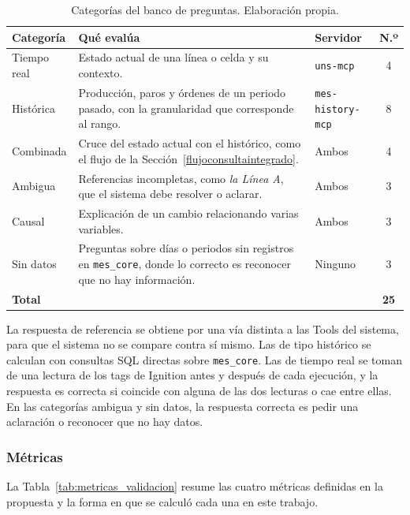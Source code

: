 \begin{table}[H]
\centering
\caption{Categorías del banco de preguntas. Elaboración propia.}
\label{tab:banco_resumen}
\small
\renewcommand{\arraystretch}{1.3}
\begin{tabular}{p{2.6cm}p{7.2cm}p{3.4cm}c}
\hline
\textbf{Categoría} & \textbf{Qué evalúa} & \textbf{Servidor} & \textbf{N.º} \\
\hline
Tiempo real & Estado actual de una línea o celda y su contexto. & \texttt{uns-mcp} & 4 \\
Histórica & Producción, paros y órdenes de un periodo pasado, con la granularidad que corresponde al rango. & \texttt{mes-history-mcp} & 8 \\
Combinada & Cruce del estado actual con el histórico, como el flujo de la Sección~\ref{flujoconsultaintegrado}. & Ambos & 4 \\
Ambigua & Referencias incompletas, como \textit{la Línea A}, que el sistema debe resolver o aclarar. & Ambos & 3 \\
Causal & Explicación de un cambio relacionando varias variables. & Ambos & 3 \\
Sin datos & Preguntas sobre días o periodos sin registros en \texttt{mes\_core}, donde lo correcto es reconocer que no hay información. & Ninguno & 3 \\
\hline
\textbf{Total} & & & \textbf{25} \\
\hline
\end{tabular}
\end{table}

La respuesta de referencia se obtiene por una vía distinta a las Tools del sistema, para que el sistema no se compare contra sí mismo. Las de tipo histórico se calculan con consultas SQL directas sobre \texttt{mes\_core}. Las de tiempo real se toman de una lectura de los tags de Ignition antes y después de cada ejecución, y la respuesta es correcta si coincide con alguna de las dos lecturas o cae entre ellas. En las categorías ambigua y sin datos, la respuesta correcta es pedir una aclaración o reconocer que no hay datos.

\subsubsection{Métricas}

La Tabla~\ref{tab:metricas_validacion} resume las cuatro métricas definidas en la propuesta y la forma en que se calculó cada una en este trabajo.

